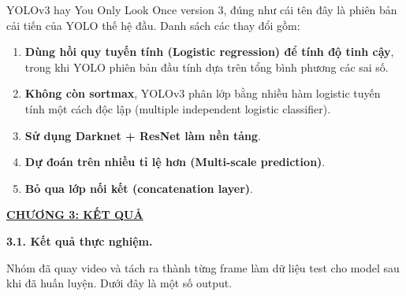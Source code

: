 \documentclass{report}
\begin{document}
\smallskip
\changefontsizes{13pt}
\setlength{\parindent}{1cm}
YOLOv3 hay You Only Look Once version 3, đúng như cái tên đây là phiên bản cải tiến của YOLO thế hệ đầu. Danh sách các thay đổi gồm:

\vspace{-0.35cm}
\begin{enumerate}
	\item \textbf{Dùng hồi quy tuyến tính (Logistic regression) để tính độ tinh cậy}, trong khi YOLO phiên bản đầu tính dựa trên tổng bình phương các sai số.
	\vspace{-0.25cm}
	\item \textbf{Không còn sortmax}, YOLOv3 phân lớp bằng nhiều hàm logistic tuyến tính một cách độc lập (multiple independent logistic classifier).
	\vspace{-0.25cm}
	\item \textbf{Sử dụng Darknet + ResNet làm nền tảng}.
	\vspace{-0.25cm}
	\item \textbf{Dự đoán trên nhiều tỉ lệ hơn (Multi-scale prediction)}.
	\vspace{-0.25cm}
	\item \textbf{Bỏ qua lớp nối kết (concatenation layer)}.	
\end{enumerate}


\newpage
\changefontsizes{16pt}
\centerline{\textbf{\hyperlink{page.7}{CHƯƠNG 3: KẾT QUẢ}}}

%
\bigskip
\changefontsizes{14pt}
\setlength{\parindent}{0.0cm}
\textbf{3.1. Kết quả thực nghiệm.}

\smallskip
\changefontsizes{13pt}
\setlength{\parindent}{1cm}

Nhóm đã quay video và tách ra thành từng frame làm dữ liệu test cho model sau khi đã huấn luyện. Dưới đây là một số output.
\end{document}
